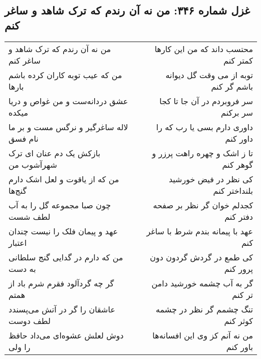 \begin{center}
\section*{غزل شماره ۳۴۶: من نه آن رندم که ترک شاهد و ساغر کنم}
\label{sec:sh346}
\begin{longtable}{l p{0.5cm} r}
من نه آن رندم که ترک شاهد و ساغر کنم
&&
محتسب داند که من این کارها کمتر کنم
\\
من که عیب توبه کاران کرده باشم بارها
&&
توبه از می وقت گل دیوانه باشم گر کنم
\\
عشق دردانه‌ست و من غواص و دریا میکده
&&
سر فروبردم در آن جا تا کجا سر برکنم
\\
لاله ساغرگیر و نرگس مست و بر ما نام فسق
&&
داوری دارم بسی یا رب که را داور کنم
\\
بازکش یک دم عنان ای ترک شهرآشوب من
&&
تا ز اشک و چهره راهت پرزر و گوهر کنم
\\
من که از یاقوت و لعل اشک دارم گنج‌ها
&&
کی نظر در فیض خورشید بلنداختر کنم
\\
چون صبا مجموعه گل را به آب لطف شست
&&
کجدلم خوان گر نظر بر صفحه دفتر کنم
\\
عهد و پیمان فلک را نیست چندان اعتبار
&&
عهد با پیمانه بندم شرط با ساغر کنم
\\
من که دارم در گدایی گنج سلطانی به دست
&&
کی طمع در گردش گردون دون پرور کنم
\\
گر چه گردآلود فقرم شرم باد از همتم
&&
گر به آب چشمه خورشید دامن تر کنم
\\
عاشقان را گر در آتش می‌پسندد لطف دوست
&&
تنگ چشمم گر نظر در چشمه کوثر کنم
\\
دوش لعلش عشوه‌ای می‌داد حافظ را ولی
&&
من نه آنم کز وی این افسانه‌ها باور کنم
\\
\end{longtable}
\end{center}
